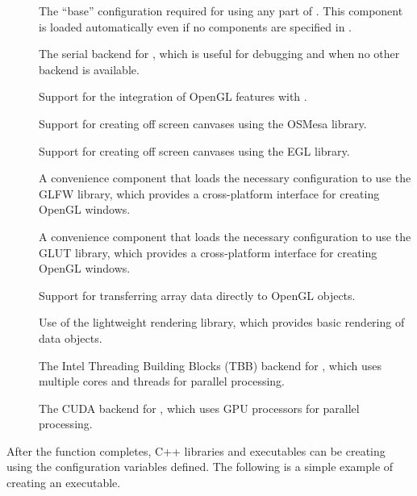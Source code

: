 \begin{description}
\item[]
  The ``base'' configuration required for using any part of \VTKm.
  This component is loaded automatically even if no components are specified in .
\item[]
  The serial backend for \VTKm, which is useful for debugging and when no other backend is available.
\item[]
  Support for the integration of OpenGL features with \VTKm.
\item[]
  Support for creating off screen canvases using the OSMesa library.
\item[]
  Support for creating off screen canvases using the EGL library.
\item[]
  A convenience component that loads the necessary configuration to use the GLFW library, which provides a cross-platform interface for creating OpenGL windows.
\item[]
  A convenience component that loads the necessary configuration to use the GLUT library, which provides a cross-platform interface for creating OpenGL windows.
\item[]
  Support for transferring \VTKm array data directly to OpenGL objects.
\item[]
  Use of the lightweight \VTKm rendering library, which provides basic rendering of \VTKm data objects.
\item[]
  The Intel Threading Building Blocks (TBB) backend for \VTKm, which uses multiple cores and threads for parallel processing.
\item[]
  The CUDA backend for \VTKm, which uses GPU processors for parallel processing.
\end{description}


\newcommand*{\cmakevtkmpackagevariable}[1]{%
  \textsf{#1}%
  \index{#1}%
  \index{CMake!VTK-m package!#1}%
  \index{VTK-m CMake package!variables!#1}}

After the  function completes, C++ libraries and executables can be creating using the configuration variables defined.
The following is a simple example of creating an executable.

